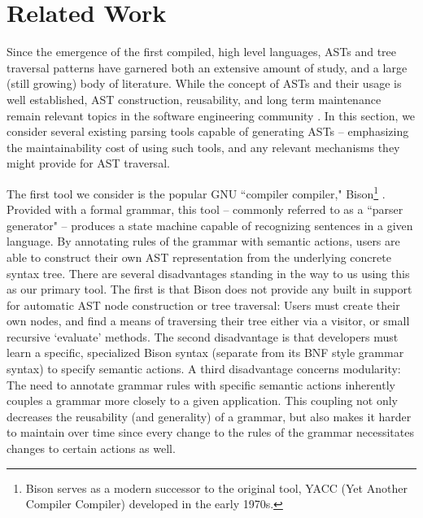 \documentclass[times]{speauth}
\begin{document}
\vspace{-6pt}


\section{Related Work}
\vspace{-2pt}

Since the emergence of the first compiled, high level languages, ASTs and tree traversal patterns have garnered both an extensive amount of study, and a large (still growing) body of literature. While the concept of ASTs and their usage is well established, AST construction, reusability, and long term maintenance remain relevant topics in the software engineering community \cite{tanumoy:2012}. In this section, we consider several existing parsing tools capable of generating ASTs -- emphasizing the maintainability cost of using such tools, and any relevant mechanisms they might provide for AST traversal.

The first tool we consider is the popular GNU ``compiler compiler," Bison\footnote{Bison serves as a modern successor to the original tool, YACC (Yet Another Compiler Compiler) developed in the early 1970s.} \cite{levine:1992}. Provided with a formal grammar, this tool -- commonly referred to as a ``parser generator" -- produces a state machine capable of recognizing sentences in a given language. By annotating rules of the grammar with semantic actions, users are able to construct their own AST representation from the underlying concrete syntax tree. There are several disadvantages standing in the way to us using this as our primary tool. The first is that Bison does not provide any built in support for automatic AST node construction or tree traversal: Users must create their own nodes, and find a means of traversing their tree either via a visitor, or small recursive `evaluate' methods. The second disadvantage is that developers must learn a specific, specialized Bison syntax (separate from its BNF style grammar syntax) to specify semantic actions. A third disadvantage concerns modularity: The need to annotate grammar rules with specific semantic actions inherently couples a grammar more closely to a given application. This coupling not only decreases the reusability (and generality) of a grammar, but also makes it harder to maintain over time since every change to the rules of the grammar necessitates changes to certain actions as well.
\end{document}
